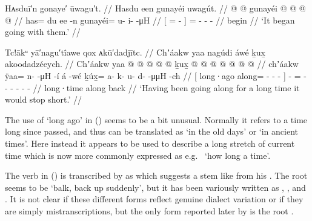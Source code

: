


\ex\label{ex:89-68-began-going}%
%
\begingl
	\glpreamble	Hᴀsduī′n g̣onaye′ ūwagu′t. //
	\glpreamble	Hasdu een g̱unayéi uwagút. //
	\gla	{}  @ {}  @ {} {}
		g̱unayéi @  @ {} @ {} @ {} //
	\glb	{} has= du ee -n {}
		g̱unayéi= u- i-  -μH //
	\glc	{}[ =   - {}]
		= - -  - //
	\gld	{}  {}  {} {}
		begin  {} {} {} //
	\glft	‘It began going with them.’
		//
\endgl
\xe

\ex\label{ex:89-69-go-long-stop-short}%
%
\begingl
	\glpreamble	Tc!ākᵘ yā′nagu′tîawe qox ᴀkū′dadjītc. //
	\glpreamble	Chʼáakw yaa nagúdi áwé ḵux̱ akoodadzéeych. //
	\gla	{} Chʼáakw yaa @  @ {} @ {} @ {} {} 
		 @ {}
		ḵux̱ @  @ {} @ {} @ {} @ {} @ {} @ {} //
	\glb	{} chʼáakw ÿaa= n-  -μH -í {}
		á -wé
		ḵúx̱= a- k- u- d-  -μμH -ch //
	\glc	{}[ long·ago along= -  - - {}]
		 -
		= - - - -  - - //
	\gld	{} long·time along  {} {} {} {}
		 {}
		back  {} {} {} {} {} {} //
	\glft	‘Having been going along for a long time it would stop short.’
		//
\endgl
\xe

The use of  ‘long ago’ in (\lastx) seems to be a bit unusual.
Normally it refers to a time long since passed, and thus can be translated as ‘in the old days’ or ‘in ancient times’.
Here instead it appears to be used to describe a long stretch of current time which is now more commonly expressed as e.g.\  ‘how long a time’.

The verb  in (\lastx) is transcribed by \citeauthor{swanton:1909} as  which suggests a stem like  from his .
The root seems to be  ‘balk, back up suddenly’, but it has been variously written as  \parencite[74.884]{story-naish:1973},  \parencite[09/113]{leer:1973}, and  \parencite[09/113]{leer:1973}.
It is not clear if these different forms reflect genuine dialect variation or if they are simply mistranscriptions, but the only form reported later by \citeauthor{leer:1978b} is the root  \parencite[39]{leer:1978b}. 

